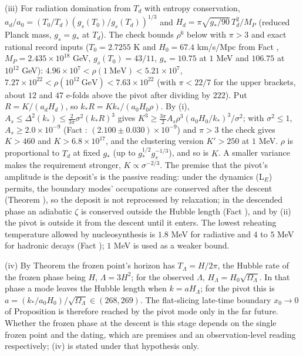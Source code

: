 (iii) For radiation domination from $T_{d}$ with entropy conservation, $a_{d}/a_{0} = (T_{0}/T_{d})(g_{s}(T_{0})/g_{s}(T_{d}))^{1/3}$ and $H_{d} = \pi\sqrt{g_{*}/90}\,T_{d}^{2}/M_{P}$ (reduced Planck mass, $g_{s} = g_{*}$ at $T_{d}$). The check bounds $\rho^{6}$ below with $\pi > 3$ and exact rational record inputs ($T_{0} = 2.7255$ K and $H_{0} = 67.4$ km/s/Mpc from Fact , $M_{P} = 2.435 \times 10^{18}$ GeV, $g_{s}(T_{0}) = 43/11$, $g_{*} = 10.75$ at $1$ MeV and $106.75$ at $10^{12}$ GeV): $4.96 \times 10^{7} < \rho(1\ \mathrm{MeV}) < 5.21 \times 10^{7}$, $7.27 \times 10^{22} < \rho(10^{12}\ \mathrm{GeV}) < 7.63 \times 10^{22}$ (with $\pi < 22/7$ for the upper brackets, about $12$ and $47$ e-folds above the pivot after dividing by $222$). Put $R = K/(a_{d}H_{d})$, so $k_{*}R = K k_{*}/(a_{0}H_{0}\rho)$. By (i), $A_{s} \le \Delta^{2}(k_{*}) \le \tfrac{2}{3\pi}\sigma^{2}(k_{*}R)^{3}$ gives $K^{3} \ge \tfrac{3\pi}{2}A_{s}\rho^{3}(a_{0}H_{0}/k_{*})^{3}/\sigma^{2}$; with $\sigma^{2} \le 1$, $A_{s} \ge 2.0 \times 10^{-9}$ (Fact : $(2.100 \pm 0.030) \times 10^{-9}$) and $\pi > 3$ the check gives $K > 460$ and $K > 6.8 \times 10^{17}$, and the clustering version $K' > 250$ at $1$ MeV. $\rho$ is proportional to $T_{d}$ at fixed $g_{*}$ (up to $g_{*}^{1/2}g_{s}^{-1/3}$), and so is $K$. A smaller variance makes the requirement stronger, $K \propto \sigma^{-2/3}$. The premise that the pivot's amplitude is the deposit's is the passive reading: under the dynamics (L$_{E}$) permits, the boundary modes' occupations are conserved after the descent (Theorem ), so the deposit is not reprocessed by relaxation; in the descended phase an adiabatic $\zeta$ is conserved outside the Hubble length (Fact ), and by (ii) the pivot is outside it from the descent until it enters. The lowest reheating temperature allowed by nucleosynthesis is $1.8$ MeV for radiative and $4$ to $5$ MeV for hadronic decays (Fact ); $1$ MeV is used as a weaker bound.

(iv) By Theorem  the frozen point's horizon has $T_{\Lambda} = H/2\pi$, the Hubble rate of the frozen phase being $H$, $\Lambda = 3H^{2}$; for the observed $\Lambda$, $H_{\Lambda} = H_{0}\sqrt{\Omega_{\Lambda}}$. In that phase a mode leaves the Hubble length when $k = aH_{\Lambda}$; for the pivot this is $a = (k_{*}/a_{0}H_{0})/\sqrt{\Omega_{\Lambda}} \in (268, 269)$. The flat-slicing late-time boundary $x_{0} \to 0$ of Proposition  is therefore reached by the pivot mode only in the far future. Whether the frozen phase at the descent is this stage depends on the single frozen point and the dating, which are premises and an observation-level reading respectively; (iv) is stated under that hypothesis only.

